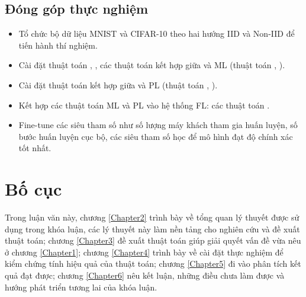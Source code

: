 \subsection{Đóng góp thực nghiệm}

\begin{itemize}
    \item Tổ chức bộ dữ liệu MNIST và CIFAR-10 theo hai hướng IID và Non-IID để tiến hành thí nghiệm.
    \item Cài đặt thuật toán , , các thuật toán kết hợp giữa  và ML (thuật toán , ).
    \item Cài đặt thuật toán kết hợp giữa  và PL (thuật toán , ).
    \item Kết hợp các thuật toán ML và PL vào hệ thống FL: các thuật toán .
    \item Fine-tune các siêu tham số như số lượng máy khách tham gia huấn luyện, số bước huấn luyện cục bộ, các siêu tham số học để mô hình đạt độ chính xác tốt nhất.
\end{itemize}

\section{Bố cục}

Trong luận văn này, chương \ref{Chapter2} trình bày về tổng quan lý thuyết được sử dụng trong khóa luận, các lý thuyết này làm nền tảng cho nghiên cứu và đề xuất thuật toán; chương \ref{Chapter3} đề xuất thuật toán giúp giải quyết vấn đề vừa nêu ở chương \ref{Chapter1}; chương \ref{Chapter4} trình bày về cài đặt thực nghiệm để kiểm chứng tính hiệu quả của thuật toán; chương \ref{Chapter5} đi vào phân tích kết quả đạt được; chương \ref{Chapter6} nêu kết luận, những điều chưa làm được và hướng phát triển tương lai của khóa luận.
